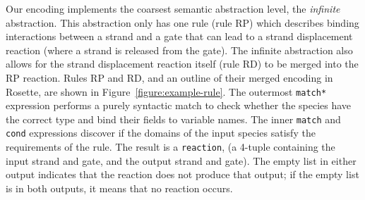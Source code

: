 \documentclass{article}[10pt]
\begin{document}
Our encoding implements the coarsest semantic abstraction level,
the \emph{infinite} abstraction. This abstraction only has one
rule (rule RP) which describes binding interactions between a strand and a gate
that can lead to a strand displacement reaction (where a strand is
released from the gate). The infinite abstraction also allows for the strand
displacement reaction itself (rule RD)
to be merged into the RP reaction.
Rules RP and RD, and an outline of their merged encoding in Rosette, are shown in
Figure~\ref{figure:example-rule}. The outermost \verb;match*; expression
performs a purely syntactic match to check whether the species have
the correct type and bind their fields to variable names.
The inner \verb;match; and \verb;cond;
expressions discover if the domains of the input species satisfy
the requirements of the rule. The result is a \verb;reaction;,
(a 4-tuple containing the input strand and gate, and the
output strand and gate). The empty list in either output indicates
that the reaction does not produce that output; if the empty list
is in both outputs, it means that no reaction occurs.
\end{document}
